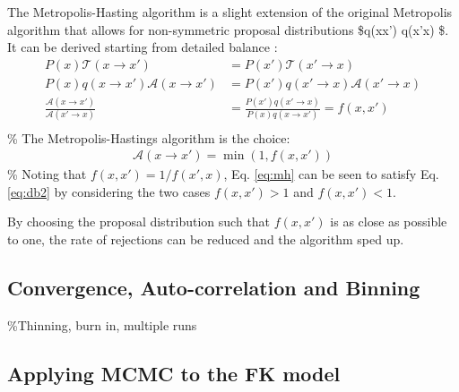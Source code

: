 The Metropolis-Hasting algorithm is a slight extension of the original Metropolis algorithm that allows for non-symmetric proposal distributions \$q(x\to x') \neq q(x'\to x) \$. It can be derived starting from detailed balance \autocite{krauthIntroductionMonteCarlo1998}: \[\begin{aligned}
P(x)\mathcal{T}(x \to x') &= P(x')\mathcal{T}(x' \to x) \\
P(x)q(x \to x')\mathcal{A}(x \to x') &= P(x')q(x' \to x)\mathcal{A}(x' \to x) \\
\label{eq:db2} \frac{\mathcal{A}(x \to x')}{\mathcal{A}(x' \to x)} &= \frac{P(x')q(x' \to x)}{P(x)q(x \to x')} = f(x, x')\\
\end{aligned}
\] \% The Metropolis-Hastings algorithm is the choice: \[
\begin{aligned}
\label{eq:mh} 
\mathcal{A}(x \to x') = \min\left(1, f(x,x')\right)
\end{aligned}
\] \% Noting that \(f(x,x') = 1/f(x',x)\), Eq. \ref{eq:mh} can be seen to satisfy Eq. \ref{eq:db2} by considering the two cases \(f(x,x') > 1\) and \(f(x,x') < 1\).

By choosing the proposal distribution such that \(f(x,x')\) is as close as possible to one, the rate of rejections can be reduced and the algorithm sped up.

\hypertarget{convergence-auto-correlation-and-binning}{%
\subsection{Convergence, Auto-correlation and Binning}\label{convergence-auto-correlation-and-binning}}

\%Thinning, burn in, multiple runs

\hypertarget{applying-mcmc-to-the-fk-model}{%
\subsection{Applying MCMC to the FK model}\label{applying-mcmc-to-the-fk-model}}

